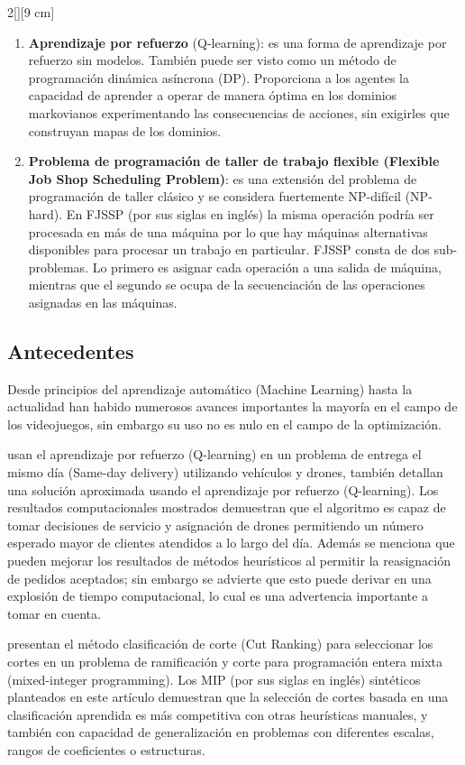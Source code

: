 \documentclass[letterpaper, 10 pt]{article}
\begin{document}
\begin{multicols}{2}[][9 cm]
\begin{enumerate}
	\item  \textbf{Aprendizaje por refuerzo} (Q-learning): \cite{watkins1992q} es una forma de aprendizaje por refuerzo sin modelos. También puede ser visto como un método de programación dinámica asíncrona (DP). Proporciona a los agentes la capacidad de aprender a operar de manera óptima en los dominios markovianos experimentando las consecuencias de acciones, sin exigirles que construyan mapas de los dominios.
	\item \textbf{Problema de programación de taller de trabajo flexible
	(Flexible Job Shop Scheduling Problem)}: \cite{pezzella2008genetic} es una extensión del problema de programación de taller clásico y se considera fuertemente NP-difícil (NP-hard). En FJSSP (por sus siglas en inglés) la misma operación podría ser procesada en más de una máquina por lo que hay máquinas alternativas disponibles para procesar un trabajo en particular. FJSSP consta de dos sub-problemas. Lo primero es asignar cada operación a una salida de máquina, mientras que el segundo se ocupa de la secuenciación de las operaciones asignadas en las máquinas.
\end{enumerate}

\subsection{Antecedentes}
Desde principios del aprendizaje automático (Machine Learning) hasta la actualidad han habido numerosos avances importantes la mayoría en el campo de los videojuegos, sin embargo su uso no es nulo en el campo de la optimización.

\cite{CHEN2022939} usan el aprendizaje por refuerzo (Q-learning) en un problema de entrega el mismo día (Same-day delivery) utilizando vehículos y drones, también detallan una solución aproximada usando el aprendizaje por refuerzo (Q-learning). Los resultados computacionales mostrados demuestran que el algoritmo es capaz de tomar decisiones de servicio y asignación de drones permitiendo un número esperado mayor de clientes atendidos a lo largo del día. Además se menciona que pueden mejorar los resultados de métodos heurísticos al permitir la reasignación de pedidos aceptados; sin embargo se advierte que esto puede derivar en una explosión de tiempo computacional, lo cual es una advertencia importante a tomar en cuenta.

 \cite{HUANG2022108353} presentan el método clasificación de corte (Cut Ranking) para seleccionar los cortes en un problema de ramificación y corte para programación entera mixta (mixed-integer programming).  Los MIP (por sus siglas en inglés) sintéticos planteados en este artículo demuestran que la selección de cortes basada en una clasificación aprendida es más competitiva con otras heurísticas manuales,  y también con capacidad de generalización en problemas con diferentes escalas, rangos de coeficientes o estructuras.


\end{multicols}
\end{document}
